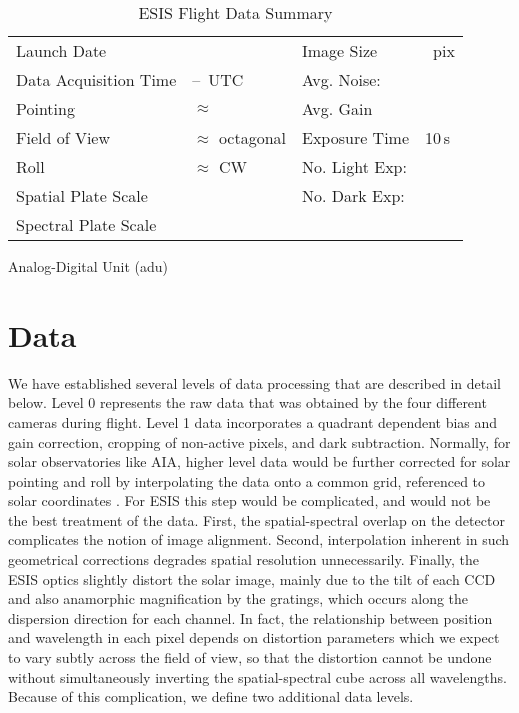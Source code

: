 		\begin{table}
		\begin{center}
			\caption{ESIS Flight Data Summary}
			\label{tab:data_info}
			\begin{tabular}{ll|ll}\hline
				Launch Date & \dateMission & Image Size  & \imageShape~pix\\
				Data Acquisition Time & \timeDataStart--\timeDataStop~UTC & Avg. Noise: & \readoutNoise\\ 
			    Pointing   &  $\approx$ \esispointing & Avg. Gain &   \gain \\
				Field of View  & $\approx$ \esisfov octagonal  & Exposure Time & 10\,s \\
				Roll & $\approx$ \esisroll CW & No. Light Exp: &\numDataFrames\\
			    Spatial  Plate Scale  &  \plateScale & No. Dark Exp: &\numDarkFrames \\
				Spectral  Plate Scale  &  \dispersion & \\
					\hline
			\end{tabular}
		Analog-Digital Unit (adu)
		\end{center}
		\end{table}
		
		



	
\section{Data} 

We have established several levels of data processing that are described in detail below.
Level 0 represents the raw data that was obtained by the four different cameras during flight.
Level 1 data incorporates %
a quadrant dependent bias and gain correction, cropping of non-active pixels, and dark subtraction.
Normally, for solar observatories like AIA, higher level data would be further corrected for solar pointing and roll by interpolating the data onto a common grid, referenced to solar coordinates \citep{Lemen2012}.
For ESIS this step would be complicated, and would not be the best treatment of the data.  
First, the spatial-spectral overlap on the detector complicates the notion of image alignment. Second, interpolation inherent in such geometrical corrections degrades spatial resolution unnecessarily.  
Finally, the ESIS optics slightly distort the solar image, mainly due to the tilt of each CCD and also anamorphic magnification by the gratings, which occurs along the dispersion direction for each channel. 
In fact, the relationship between position and wavelength in each pixel depends on distortion parameters which we expect to vary subtly across the field of view, so that the distortion cannot be undone without simultaneously inverting the spatial-spectral cube across all wavelengths.
Because of this complication, we define two additional data levels.  

